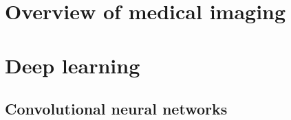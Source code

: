 \chapter{Overview of medical imaging}

\chapter{Deep learning}
\section{Convolutional neural networks}



